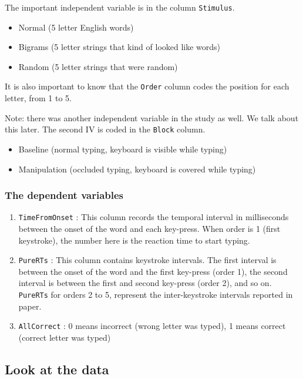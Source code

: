 \documentclass[
]{book}
\providecommand{\tightlist}{%
  \setlength{\itemsep}{0pt}\setlength{\parskip}{0pt}}
\begin{document}
The important independent variable is in the column \texttt{Stimulus}.

\begin{itemize}
\tightlist
\item
  Normal (5 letter English words)
\item
  Bigrams (5 letter strings that kind of looked like words)
\item
  Random (5 letter strings that were random)
\end{itemize}

It is also important to know that the \texttt{Order} column codes the position for each letter, from 1 to 5.

Note: there was another independent variable in the study as well. We talk about this later. The second IV is coded in the \texttt{Block} column.

\begin{itemize}
\tightlist
\item
  Baseline (normal typing, keyboard is visible while typing)
\item
  Manipulation (occluded typing, keyboard is covered while typing)
\end{itemize}

\hypertarget{the-dependent-variables}{%
\subsubsection{The dependent variables}\label{the-dependent-variables}}

\begin{enumerate}
\def\labelenumi{\arabic{enumi}.}
\tightlist
\item
  \texttt{TimeFromOnset} : This column records the temporal interval in milliseconds between the onset of the word and each key-press. When order is 1 (first keystroke), the number here is the reaction time to start typing.
\item
  \texttt{PureRTs} : This column contains keystroke intervals. The first interval is between the onset of the word and the first key-press (order 1), the second interval is between the first and second key-press (order 2), and so on. \texttt{PureRTs} for orders 2 to 5, represent the inter-keystroke intervals reported in paper.
\item
  \texttt{AllCorrect} : 0 means incorrect (wrong letter was typed), 1 means correct (correct letter was typed)
\end{enumerate}

\hypertarget{look-at-the-data-3}{%
\subsection{Look at the data}\label{look-at-the-data-3}}
\end{document}
